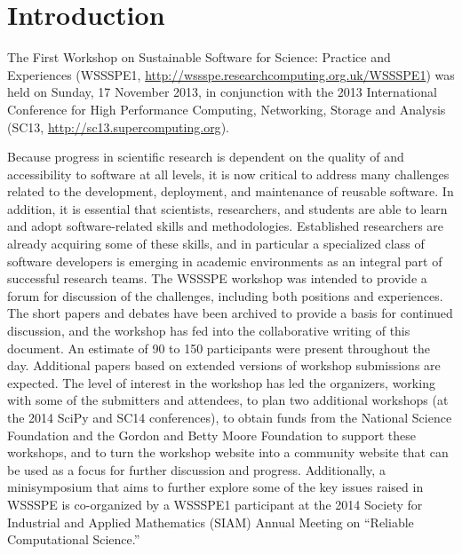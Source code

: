 \documentclass[11pt, oneside]{amsart}
\newcommand{\todo}[1]{{\color{blue}$\blacksquare$~\textsf{[TODO: #1]}}}
\newcommand{\note}[1]{ {\textcolor{red}    { #1 }}}
\begin{document}
\begin{comment}
The original document is
\url{https://docs.google.com/document/d/1eVfioGNlihXG_1Y8BgdCI6tXZKrybZgz5XuQHjT1oKU/edit?pli=1#}
(but can no longer be edited).  Note that the original document has
comments in addition to text.
\end{comment}

%
%
%

\section{Introduction}

The First Workshop on Sustainable Software for Science: Practice and
Experiences (WSSSPE1,
\url{http://wssspe.researchcomputing.org.uk/WSSSPE1}) was held on
Sunday, 17 November 2013, in conjunction with the 2013 International
Conference for High Performance Computing, Networking, Storage and
Analysis (SC13, \url{http://sc13.supercomputing.org}).

Because progress in scientific research is dependent on the quality of and
accessibility to software at all levels, it is now critical to address many
challenges related to the development, deployment, and maintenance of reusable
software.
In addition, it is essential that scientists,
researchers, and students are able to learn and adopt software-related skills
and methodologies. Established researchers are already acquiring some of these
skills, and in particular a specialized class of software developers is
emerging in academic environments as an integral part of
successful research teams. The WSSSPE workshop was intended to provide a forum
for discussion of the challenges, including both positions and experiences. The
short papers and debates have been archived to provide a basis for continued
discussion, and the workshop has fed into the collaborative writing of this
document. An estimate of 90 to 150 participants were present
throughout the day. Additional papers based on extended versions of workshop
submissions are expected. The level of interest in the workshop has led the
organizers, working with some of the submitters and attendees, to plan two
additional workshops (at the 2014 SciPy and SC14 conferences), to obtain
funds from the National Science Foundation and the Gordon and Betty Moore
Foundation to support these workshops, and to turn the
workshop website into a community website that can be used as a focus for
further discussion and progress. Additionally, a minisymposium that aims to
further explore some of the key issues raised in WSSSPE is co-organized by a
WSSSPE1 participant at the 2014 Society for Industrial and Applied Mathematics
(SIAM) Annual Meeting on ``Reliable
Computational Science.''
\end{document}
